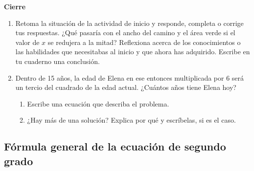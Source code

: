 \begin{boxK}
    \begin{center}\textbf{Cierre}\end{center}

    \begin{enumerate}
        \item Retoma la situación de la actividad de inicio y responde, completa o corrige
              tus respuestas. ¿Qué pasaría con el ancho del camino y el área verde si el
              valor de $x$ se redujera a la mitad?
              Reflexiona acerca de los conocimientos o las habilidades que necesitabas al
              inicio y que ahora has adquirido. Escribe en tu cuaderno una conclusión.
        \item Dentro de 15 años, la edad de Elena en ese entonces multiplicada por 6 será
              un tercio del cuadrado de la edad actual. ¿Cuántos años tiene Elena hoy?

              \begin{enumerate}
                  \item Escribe una ecuación que describa el problema.
                  \item ¿Hay más de una solución? Explica por qué y escríbelas, si es el caso.
              \end{enumerate}
    \end{enumerate}
\end{boxK}

\newpage

\subsection{Fórmula general de la ecuación de segundo grado}

